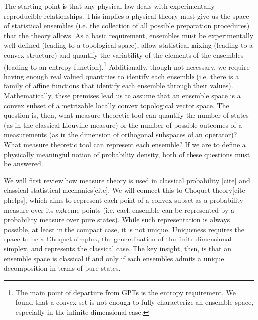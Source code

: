 \documentclass[10pt,twocolumn, nofootinbib]{revtex4-2}
\begin{document}
The starting point is that any physical law deals with experimentally reproducible relationships. This implies a physical theory must give us the space of statistical ensembles (i.e. the collection of all possible preparation procedures) that the theory allows. As a basic requirement, ensembles must be experimentally well-defined (leading to a topological space), allow statistical mixing (leading to a convex structure) and quantify the variability of the elements of the ensembles (leading to an entropy function).\footnote{The main point of departure from GPTs is the entropy requirement. We found that a convex set is not enough to fully characterize an ensemble space, especially in the infinite dimensional case.} Additionally, though not necessary, we require having enough real valued quantities to identify each ensemble (i.e. there is a family of affine functions that identify each ensemble through their values). Mathematically, these premises lead us to assume that an ensemble space is a convex subset of a metrizable locally convex topological vector space. The question is, then, what measure theoretic tool can quantify the number of states (as in the classical Liouville measure) or the number of possible outcomes of a measurements (as in the dimension of orthogonal subspaces of an operator)? What measure theoretic tool can represent each ensemble? If we are to define a physically meaningful notion of probability density, both of these questions must be answered.

We will first review how measure theory is used in classical probability [cite] and classical statistical mechanics[cite]. We will connect this to Choquet theory[cite phelps], which aims to represent each point of a convex subset as a probability measure over its extreme points (i.e. each ensemble can be represented by a probability measure over pure states). While such representation is always possible, at least in the compact case, it is not unique. Uniqueness requires the space to be a Choquet simplex, the generalization of the finite-dimensional simplex, and represents the classical case. The key insight, then, is that an ensemble space is classical if and only if each ensembles admits a unique decomposition in terms of pure states.
\end{document}
